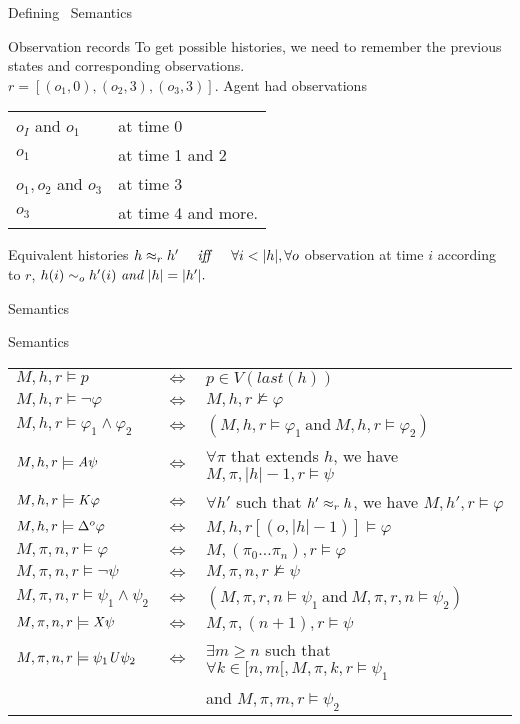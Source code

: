 \begin{frame}{Defining \ctlskd\ Semantics}

  \begin{block}{Observation records}
    To get possible histories, we need to remember the previous states and corresponding observations.\\
    $r=[(o_1,0),(o_2,3),(o_3,3)]$.
    Agent had observations
    \begin{tabular}{l l}
      $o_I$ and $o_1$ & at time 0\\
      $o_1$ & at time 1 and 2\\
      $o_1,o_2$ and $o_3$ & at time 3\\
      $o_3$ & at time 4 and more.
    \end{tabular}
  \end{block}
  \vfill
  \begin{block}{Equivalent histories}
    $h\approx_{r}h'\quad\ \mathit{iff}\ \quad \forall i< |h|, \forall o$ observation at time $i$ according to $r$, $h(i)\sim_{o} h'(i)~\textit{and}~|h|=|h'|.$
  \end{block}
  
\end{frame}


\begin{frame}{\ctlskd\quad Semantics}
  \footnotesize
  \begin{block}{Semantics}
    \begin{tabular}{l c l}
      $M,h,r \models p $&$ \iff $&$ p\in V(\mathit{last}(h))$\\
      $M,h,r \models \neg\varphi $&$ \iff $&$ M,h,r\not\models\varphi$\\
      $M,h,r \models \varphi_1\wedge\varphi_2 $&$ \iff $&$ (M,h,r\models\varphi_1~\text{and}~ M,h,r\models\varphi_2)$\\
      $M,h,r \models \mathit{A}\psi  $&$ \iff $&$ \forall\pi$ that extends $h$, we have $M,\pi,|h|-1,r\models\psi$\\
      \color{red!85!blue}$M,h,r \models\mathit{K}\varphi  $&$ \iff $&\color{red!85!blue}$ \forall h'$ such that $h'\approx_{r}h$, we have $M,h',r\models\varphi$\\
      \color{red!85!blue}$M,h,r \models \Delta^{o}\varphi $&$ \iff $&\color{red!85!blue}$ M,h,r[(o,|h|-1)]\models\varphi$\\
      $M,\pi,n,r\models\varphi $&$ \iff $&$ M,(\pi_0\dots\pi_n),r\models\varphi$\\
      $M,\pi,n,r\models\neg\psi $&$ \iff $&$ M,\pi,n,r\not\models\psi$\\
      $M,\pi,n,r\models \psi_1\wedge\psi_2 $&$ \iff $&$ (M,\pi,r,n\models\psi_1~\text{and}~ M,\pi,r,n\models\psi_2)$\\
      $M,\pi,n,r\models\mathit{X}\psi $&$ \iff $&$  M,\pi,(n+1),r\models\psi$\\
      $M,\pi,n,r\models \psi_1\mathit{U}\psi_2 $&$ \iff $&$ \exists m\geq n$ such that $\forall k\in[n,m[, M,\pi,k,r\models\psi_1$\\
          & & and $M,\pi,m,r\models\psi_2$
    \end{tabular}
  \end{block}
\end{frame}

